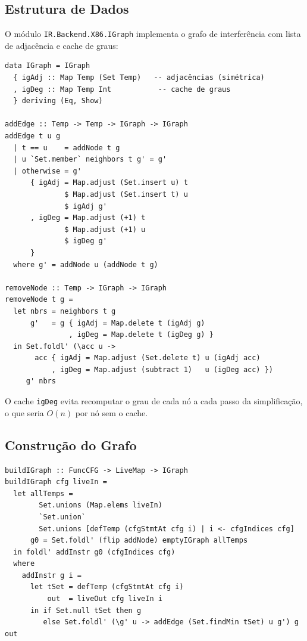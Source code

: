 \subsection{Estrutura de Dados}

O módulo \texttt{IR.Backend.X86.IGraph} implementa o grafo de
interferência com lista de adjacência e cache de graus:

\begin{verbatim}
data IGraph = IGraph
  { igAdj :: Map Temp (Set Temp)   -- adjacências (simétrica)
  , igDeg :: Map Temp Int           -- cache de graus
  } deriving (Eq, Show)

addEdge :: Temp -> Temp -> IGraph -> IGraph
addEdge t u g
  | t == u    = addNode t g
  | u `Set.member` neighbors t g' = g'
  | otherwise = g'
      { igAdj = Map.adjust (Set.insert u) t
              $ Map.adjust (Set.insert t) u
              $ igAdj g'
      , igDeg = Map.adjust (+1) t
              $ Map.adjust (+1) u
              $ igDeg g'
      }
  where g' = addNode u (addNode t g)

removeNode :: Temp -> IGraph -> IGraph
removeNode t g =
  let nbrs = neighbors t g
      g'   = g { igAdj = Map.delete t (igAdj g)
               , igDeg = Map.delete t (igDeg g) }
  in Set.foldl' (\acc u ->
       acc { igAdj = Map.adjust (Set.delete t) u (igAdj acc)
           , igDeg = Map.adjust (subtract 1)   u (igDeg acc) })
     g' nbrs
\end{verbatim}

O cache \texttt{igDeg} evita recomputar o grau de cada nó a cada passo
da simplificação, o que seria $O(n)$ por nó sem o cache.

\subsection{Construção do Grafo}

\begin{verbatim}
buildIGraph :: FuncCFG -> LiveMap -> IGraph
buildIGraph cfg liveIn =
  let allTemps =
        Set.unions (Map.elems liveIn)
        `Set.union`
        Set.unions [defTemp (cfgStmtAt cfg i) | i <- cfgIndices cfg]
      g0 = Set.foldl' (flip addNode) emptyIGraph allTemps
  in foldl' addInstr g0 (cfgIndices cfg)
  where
    addInstr g i =
      let tSet = defTemp (cfgStmtAt cfg i)
          out  = liveOut cfg liveIn i
      in if Set.null tSet then g
         else Set.foldl' (\g' u -> addEdge (Set.findMin tSet) u g') g out
\end{verbatim}

